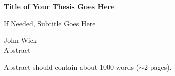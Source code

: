 \chapter*{ }
\begin{center}
\begin{Large}
\bf{Title of Your Thesis Goes Here}\\
\end{Large}
\vspace{2mm} 
\begin{Large}
If Needed, Subtitle Goes Here\\
\end{Large}
\vspace{10mm}
\begin{large}
John Wick\\
\vspace{10mm}
Abstract
\end{large}
\end{center}

Abstract should contain about 1000 words ($\sim$2 pages). 
\lipsum[1-8]
